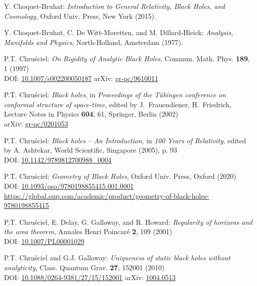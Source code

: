 \begin{thebibliography}{123}
Y. Choquet-Bruhat: {\em Introduction to General Relativity, Black Holes, and
Cosmology}, Oxford Univ. Press, New York (2015).

Y. Choquet-Bruhat, C. De Witt-Moretten, and M. Dillard-Bleick:
{\em Analysis, Manifolds and Physics},
North-Holland, Amsterdam (1977).

P.T. Chru\'sciel: {\em On Rigidity of Analytic Black Holes},
Commun. Math. Phys. {\bf 189}, 1 (1997) \\
DOI: \href{https://doi.org/10.1007/s002200050187}{10.1007/s002200050187}\hfill
arXiv: \href{https://arxiv.org/abs/gr-qc/9610011}{gr-qc/9610011}

P.T. Chru\'sciel: {\em Black holes},
in {\em Proceedings of the T\"ubingen conference on conformal structure of
space-time}, edited by J.~Frauendiener, H.~Friedrich,
Lecture Notes in Physics {\bf 604}, 61,
Springer, Berlin (2002)\\
arXiv: \href{https://arxiv.org/abs/gr-qc/0201053}{gr-qc/0201053}

P.T. Chru\'sciel: {\em Black holes -- An Introduction},
in {\em 100 Years of Relativity}, edited by A. Ashtekar,
World Scientific, Singapore (2005), p. 93\\
DOI: \href{https://doi.org/10.1142/9789812700988_0004}{10.1142/9789812700988\_0004}

P.T. Chru\'sciel: {\em Geometry of Black Holes},
Oxford Univ. Press, Oxford (2020)\\
DOI: \href{https://doi.org/10.1093/oso/9780198855415.001.0001}{10.1093/oso/9780198855415.001.0001}\\
{\footnotesize \url{https://global.oup.com/academic/product/geometry-of-black-holes-9780198855415}}

P.T. Chru\'sciel, E. Delay, G. Galloway, and R. Howard:
{\em Regularity of horizons and the area theorem},
Annales Henri Poincar\'e {\bf 2}, 109 (2001)\\
DOI: \href{https://doi.org/10.1007/PL00001029}{10.1007/PL00001029}

P.T. Chru\'sciel and G.J. Galloway:
{\em Uniqueness of static black holes without analyticity},
Class. Quantum Grav. {\bf 27}, 152001 (2010)\\
DOI: \href{https://doi.org/10.1088/0264-9381/27/15/152001}{10.1088/0264-9381/27/15/152001}\hfill
arXiv: \href{https://arxiv.org/abs/1004.0513}{1004.0513}


\end{thebibliography}
